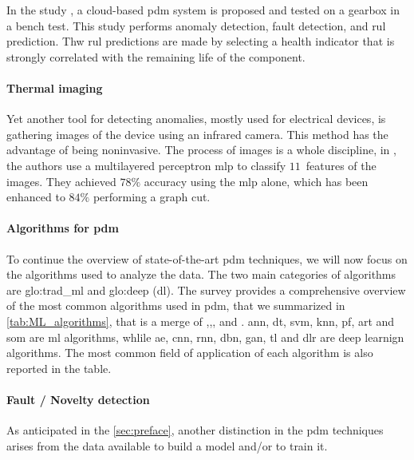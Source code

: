 In the study \cite{calabreseRUL}, a cloud-based \gls{pdm} system is proposed and tested on a gearbox in a bench test. This study performs anomaly detection, fault detection, and \gls{rul} prediction. Thw \gls{rul} predictions are made by selecting a health indicator that is strongly correlated with the remaining life of the component.


\paragraph{Thermal imaging}
Yet another tool for detecting anomalies, mostly used for electrical devices, is gathering images of the device using an infrared camera. This method has the advantage of being noninvasive. The process of images is a whole discipline, in \cite{Thermography}, the authors use a multilayered perceptron \gls{mlp} to classify $11$~features of the images. They achieved $78\%$ accuracy using the \gls{mlp} alone, which has been enhanced to $84\%$ performing a graph cut.

\paragraph{Algorithms for \gls{pdm}}
To continue the overview of state-of-the-art \gls{pdm} techniques, we will now focus on the algorithms used to analyze the data. The two main categories of algorithms are \gls{glo:trad_ml} and \gls{glo:deep} (\gls{dl}).  The survey \cite{ran2019survey} provides a comprehensive overview of the most common algorithms used in \gls{pdm}, that we summarized in \autoref{tab:ML_algorithms}, that is a merge of \cite{ran2019survey},\cite{particlefilter},\cite{yang2018particle},\cite{VONBIRGELEN2018480} and \cite{lira2011adaptive}. \gls{ann}, \gls{dt}, \gls{svm}, \gls{knn}, \gls{pf}, \gls{art} and \gls{som} are \gls{ml} algorithms, whlile \gls{ae}, \gls{cnn}, \gls{rnn}, \gls{dbn}, \gls{gan}, \gls{tl} and \gls{dlr} are deep learnign algorithms. The most common field of application of each algorithm is also reported in the table.



\paragraph*{Fault / Novelty detection}

As anticipated in the \autoref{sec:preface}, another distinction in the \gls{pdm} techniques arises from the data available to build a model and/or to train it.

